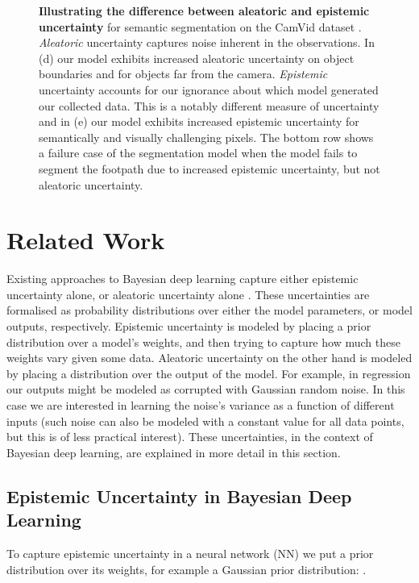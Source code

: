 \documentclass{article}
\begin{document}
\begin{figure*}[t]
{\begin{subfigure}[t]{0.22\linewidth}
\end{subfigure}}
\caption{\textbf{Illustrating the difference between aleatoric and epistemic uncertainty} for semantic segmentation on the CamVid dataset \citep{brostow2009semantic}. 
\textit{Aleatoric} uncertainty captures noise inherent in the observations. In (d) our model exhibits increased aleatoric uncertainty on object boundaries and for objects far from the camera.
\textit{Epistemic} uncertainty accounts for our ignorance about which model generated our collected data. This is a notably different measure of uncertainty and in (e) our model exhibits increased epistemic uncertainty for semantically and visually challenging pixels.
The bottom row shows a failure case of the segmentation model when the model fails to segment the footpath due to increased epistemic uncertainty, but not aleatoric uncertainty.}
\label{fig:camvid_qual}
\end{figure*}

\section{Related Work}
\label{related_work}

Existing approaches to Bayesian deep learning capture either epistemic uncertainty alone, or aleatoric uncertainty alone \cite{gal2016thesis}. These uncertainties are formalised as probability distributions over either the model parameters, or model outputs, respectively. Epistemic uncertainty is modeled by placing a prior distribution over a model's weights, and then trying to capture how much these weights vary given some data. Aleatoric uncertainty on the other hand is modeled by placing a distribution over the output of the model. For example, in regression our outputs might be modeled as corrupted with Gaussian random noise. In this case we are interested in learning the noise's variance as a function of different inputs (such noise can also be modeled with a constant value for all data points, but this is of less practical interest). These uncertainties, in the context of Bayesian deep learning, are explained in more detail in this section. 

\subsection{Epistemic Uncertainty in Bayesian Deep Learning}
\label{sect:dropout_VI}

To capture epistemic uncertainty in a neural network (NN) we put a prior distribution over its weights, for example a Gaussian prior distribution:
.
\end{document}

